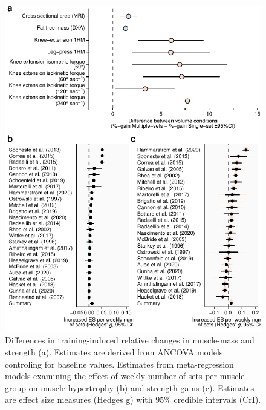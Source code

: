 \documentclass[twoside,10pt]{gihclass} %
\begin{document}
\pagebreak
\begin{figure}

{\centering \includegraphics{thesis_files/figure-latex/comb-fig-s1-1} 

}

\caption[Differences in training induced changes to muscle mass and strength measures between volume conditions in Study I and weekly training volume meta-regression.]{Differences in training-induced relative changes in muscle-mass and strength (a). Estimates are derived from ANCOVA models controling for baseline values. Estimates from meta-regression models examining the effect of weekly number of sets per muscle group on muscle hypertrophy (b) and strength gains (c). Estimates are effect size measures (Hedges g) with 95\% credible intervals (CrI).}\label{fig:comb-fig-s1}
\end{figure}
\pagebreak
\end{document}
